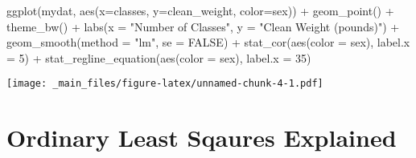 \documentclass[
]{book}
\newenvironment{Shaded}{\begin{snugshade}}{\end{snugshade}}
\newcommand{\AttributeTok}[1]{\textcolor[rgb]{0.77,0.63,0.00}{#1}}
\newcommand{\ConstantTok}[1]{\textcolor[rgb]{0.00,0.00,0.00}{#1}}
\newcommand{\DecValTok}[1]{\textcolor[rgb]{0.00,0.00,0.81}{#1}}
\newcommand{\FunctionTok}[1]{\textcolor[rgb]{0.00,0.00,0.00}{#1}}
\newcommand{\NormalTok}[1]{#1}
\newcommand{\SpecialCharTok}[1]{\textcolor[rgb]{0.00,0.00,0.00}{#1}}
\newcommand{\StringTok}[1]{\textcolor[rgb]{0.31,0.60,0.02}{#1}}
\begin{document}
\begin{Shaded}
\begin{Highlighting}[]
\FunctionTok{ggplot}\NormalTok{(mydat, }\FunctionTok{aes}\NormalTok{(}\AttributeTok{x=}\NormalTok{classes, }\AttributeTok{y=}\NormalTok{clean\_weight, }\AttributeTok{color=}\NormalTok{sex)) }\SpecialCharTok{+}
  \FunctionTok{geom\_point}\NormalTok{() }\SpecialCharTok{+}
  \FunctionTok{theme\_bw}\NormalTok{() }\SpecialCharTok{+}
  \FunctionTok{labs}\NormalTok{(}\AttributeTok{x =} \StringTok{"Number of Classes"}\NormalTok{, }\AttributeTok{y =} \StringTok{"Clean Weight (pounds)"}\NormalTok{) }\SpecialCharTok{+}
  \FunctionTok{geom\_smooth}\NormalTok{(}\AttributeTok{method =} \StringTok{"lm"}\NormalTok{, }\AttributeTok{se =} \ConstantTok{FALSE}\NormalTok{)  }\SpecialCharTok{+}
  \FunctionTok{stat\_cor}\NormalTok{(}\FunctionTok{aes}\NormalTok{(}\AttributeTok{color =}\NormalTok{ sex), }\AttributeTok{label.x =} \DecValTok{5}\NormalTok{) }\SpecialCharTok{+}
  \FunctionTok{stat\_regline\_equation}\NormalTok{(}\FunctionTok{aes}\NormalTok{(}\AttributeTok{color =}\NormalTok{ sex), }\AttributeTok{label.x =} \DecValTok{35}\NormalTok{) }
\end{Highlighting}
\end{Shaded}

\texttt{[image: \_main\_files/figure-latex/unnamed-chunk-4-1.pdf]}

\hypertarget{ordinary-least-sqaures-explained}{%
\section{Ordinary Least Sqaures Explained}\label{ordinary-least-sqaures-explained}}

  
\end{document}
